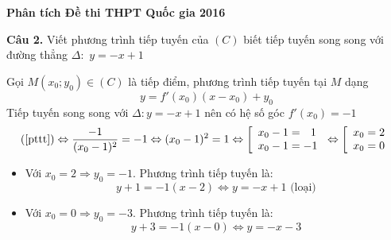 \documentclass[handout]{beamer} %
\newcommand{\cau}[2]{\begin{block}{}
		{\color{red}\textbf{Câu #1.}} #2
	\end{block}
}
\begin{document}
\begin{frame}{\textbf{\qquad Phân tích Đề thi THPT Quốc gia 2016}}
	\cau{2}{Viết phương trình tiếp tuyến của $(C)$ biết tiếp tuyến song song với đường thẳng $\Delta:$ $y=-x+1$}
	Gọi $M(x_0;y_0)\in(C)$ là tiếp điểm, phương trình tiếp tuyến tại $M$ dạng \begin{equation}\label{pttt}
		y=f'(x_0)(x-x_0)+y_0
	\end{equation}
	Tiếp tuyến song song với $\Delta: y=-x+1$ nên có hệ số góc $f'(x_0)=-1$	
	$$(\ref{pttt})\Leftrightarrow \frac{-1}{(x_0-1)^2}=-1\Leftrightarrow (x_0-1)^2=1\Leftrightarrow \left[\begin{array}{l}
	x_0-1=~~1\\x_0-1=-1
	\end{array}\right.\Leftrightarrow
	\left[\begin{array}{l}
	x_0=2\\x_0=0
	\end{array}\right.$$
	\begin{itemize}
		\item Với $x_0=2\Rightarrow y_0=-1$. Phương trình tiếp tuyến là: $$y+1=-1(x-2)\Leftrightarrow y=-x+1 \mbox{ (loại)}$$
		
		\item Với $x_0=0\Rightarrow y_0=-3$. Phương trình tiếp tuyến là: $$y+3=-1(x-0)\Leftrightarrow y=-x-3$$
	\end{itemize}~\\[25pt]
\end{frame}
\end{document}
